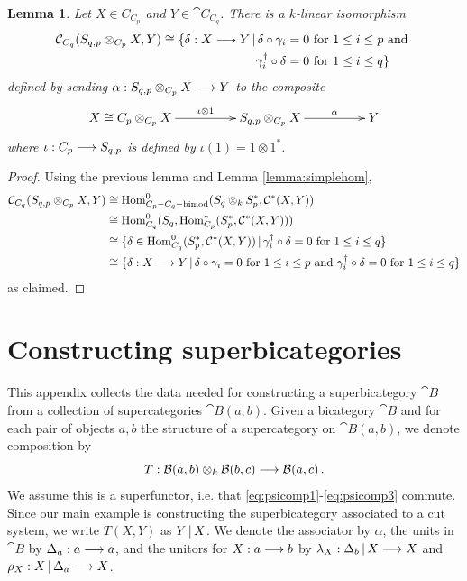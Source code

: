 \documentclass[english,letter paper,12pt,leqno]{article}
\newtheorem{lemma}[theorem]{Lemma}
\theoremstyle{example}
\numberwithin{equation}{section}
\def\Hom{\operatorname{Hom}}
\begin{document}
\begin{lemma}\label{lemma:morphisms_two_forms} Let $X \in C_{C_p}$ and $Y \in \cat{C}_{C_q}$. There is a $k$-linear isomorphism
\begin{align*}
\mathcal{C}_{C_q}( S_{q,p} \otimes_{C_p} X, Y ) \cong \{ \delta: X \longrightarrow Y \,|\, \delta \circ \gamma_i &= 0 \text{ for } 1 \le i \le p \text{ and }\\ \gamma_i^\dagger \circ \delta &= 0 \text{ for } 1 \le i \le q \}
\end{align*}
defined by sending $\alpha: S_{q,p} \otimes_{C_p} X \longrightarrow Y$ to the composite
\[
\xymatrix@C+2pc{
X \cong C_p \otimes_{C_p} X \ar[r]^-{\iota \otimes 1} & S_{q,p} \otimes_{C_p} X \ar[r]^-{\alpha} & Y
}
\]
where $\iota: C_p \longrightarrow S_{q,p}$ is defined by $\iota(1) = 1 \otimes 1^*$.
\end{lemma}
\begin{proof}
Using the previous lemma and Lemma \ref{lemma:simplehom},
\begin{align*}
\cat{C}_{C_q}( S_{q,p} \otimes_{C_p} X, Y ) &\cong \Hom^0_{C_p-C_q-\operatorname{bimod}}( S_{q} \otimes_k S_p^* , \cat{C}^*(X,Y))\\
&\cong \Hom^0_{C_q}( S_q, \Hom^*_{C_p}( S_p^*, \cat{C}^*(X,Y) ))\\
&\cong \{ \delta \in \Hom^0_{C_q}( S_p^*, \cat{C}^*(X,Y) ) \l \gamma_i^\dagger \circ \delta = 0 \text{ for } 1 \le i \le q \}\\
&\cong \{ \delta: X \lto Y \l \delta \circ \gamma_i = 0 \text{ for } 1 \le i \le p \text{ and } \gamma_i^\dagger \circ \delta = 0 \text{ for } 1 \le i \le q \}
\end{align*}
as claimed.
\end{proof}

\section{Constructing superbicategories}\label{section:constructing_superbicategories}

This appendix collects the data needed for constructing a superbicategory $\cat{B}$ from a collection of supercategories $\cat{B}(a,b)$. Given a bicategory $\cat{B}$ and for each pair of objects $a,b$ the structure of a supercategory on $\cat{B}(a,b)$, we denote composition by
\[
T: \mathcal{B}(a, b) \otimes_k \mathcal{B}(b,c) \longrightarrow \mathcal{B}(a,c)\,.
\]
We assume this is a superfunctor, i.e. that \eqref{eq:psicomp1}-\eqref{eq:psicomp3} commute. Since our main example is constructing the superbicategory associated to a cut system, we write $T(X,Y)$ as $Y \,|\, X$. We denote the associator by $\alpha$, the units in $\cat{B}$ by $\Delta_a: a \longrightarrow a$, and the unitors for $X: a \longrightarrow b$ by $\lambda_X: \Delta_b \,|\, X \longrightarrow X$ and $\rho_X: X \,|\, \Delta_a \longrightarrow X$.
\end{document}
